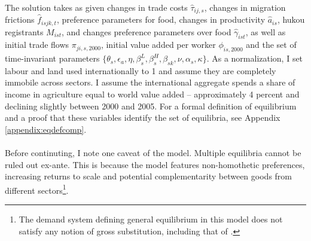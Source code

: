 \documentclass[]{article}
\theoremstyle{plain}
\begin{document}
 \paragraph*{}
  The solution takes as given changes in trade costs $\hat{\tau}_{ij, s}$, changes in migration frictions $\hat{f}_{isjk, t}$, preference parameters for food, changes in productivity $\hat{a}_{is}$, hukou registrants $M_{ist}$, and changes preference parameters over food $\hat{\gamma}_{ist}$, as well as initial trade flows $\pi_{ji,s,2000}$, initial value added per worker $\phi_{is, 2000}$ and the set of time-invariant parameters
$\{\theta_{s}, \epsilon_{a}, \eta, \beta_{s}^{L}, \beta^{H}_{s}, \beta_{sk}, \nu, \alpha_{s}, \kappa\}$. As a normalization, I set labour and land used internationally to 1 and assume they are completely immobile across sectors. I assume the international aggregate spends a share of income in agriculture equal to world value added -- approximately 4 percent and declining slightly between 2000 and 2005.  For a formal definition of equilibrium and a proof that these variables identify the set of equilibria, see Appendix \ref{appendix:eqdefcomp}.
\paragraph*{}
Before continuting, I note one caveat of the model. Multiple equilibria cannot be ruled out ex-ante. This is because the model features non-homothetic preferences, increasing returns to scale and potential complementarity between goods from different sectors\footnote{The demand system defining general equilibrium in this model does not satisfy any notion of gross substitution, including that of  \cite{connectedsubstitutes}.}.
\end{document}
